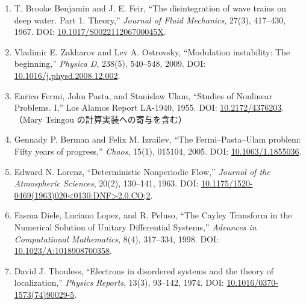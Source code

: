 \documentclass[
  a4paper,
]{ltjsarticle}
\providecommand{\tightlist}{%
  \setlength{\itemsep}{0pt}\setlength{\parskip}{0pt}}
\begin{document}
\begin{enumerate}
\def\labelenumi{\arabic{enumi}.}
\setcounter{enumi}{4}
\tightlist
\item
  T. Brooke Benjamin and J. E. Feir, ``The disintegration of wave trains
  on deep water. Part 1. Theory,'' \emph{Journal of Fluid Mechanics},
  27(3), 417--430, 1967. DOI:
  \href{https://doi.org/10.1017/S002211206700045X}{10.1017/S002211206700045X}.
\item
  Vladimir E. Zakharov and Lev A. Ostrovsky, ``Modulation instability:
  The beginning,'' \emph{Physica D}, 238(5), 540--548, 2009. DOI:
  \href{https://doi.org/10.1016/j.physd.2008.12.002}{10.1016/j.physd.2008.12.002}.
\item
  Enrico Fermi, John Pasta, and Stanislaw Ulam, ``Studies of Nonlinear
  Problems. I,'' Los Alamos Report LA-1940, 1955. DOI:
  \href{https://doi.org/10.2172/4376203}{10.2172/4376203}.（Mary Tsingou
  の計算実装への寄与を含む）
\item
  Gennady P. Berman and Felix M. Izrailev, ``The Fermi--Pasta--Ulam
  problem: Fifty years of progress,'' \emph{Chaos}, 15(1), 015104, 2005.
  DOI: \href{https://doi.org/10.1063/1.1855036}{10.1063/1.1855036}.
\item
  Edward N. Lorenz, ``Deterministic Nonperiodic Flow,'' \emph{Journal of
  the Atmospheric Sciences}, 20(2), 130--141, 1963. DOI:
  \href{https://doi.org/10.1175/1520-0469(1963)020\%3C0130:DNF\%3E2.0.CO;2}{10.1175/1520-0469(1963)020\textless0130:DNF\textgreater2.0.CO;2}.
\item
  Fasma Diele, Luciano Lopez, and R. Peluso, ``The Cayley Transform in
  the Numerical Solution of Unitary Differential Systems,''
  \emph{Advances in Computational Mathematics}, 8(4), 317--334, 1998.
  DOI:
  \href{https://doi.org/10.1023/A:1018908700358}{10.1023/A:1018908700358}.
\item
  David J. Thouless, ``Electrons in disordered systems and the theory of
  localization,'' \emph{Physics Reports}, 13(3), 93--142, 1974. DOI:
  \href{https://doi.org/10.1016/0370-1573(74)90029-5}{10.1016/0370-1573(74)90029-5}.
\end{enumerate}
\end{document}
